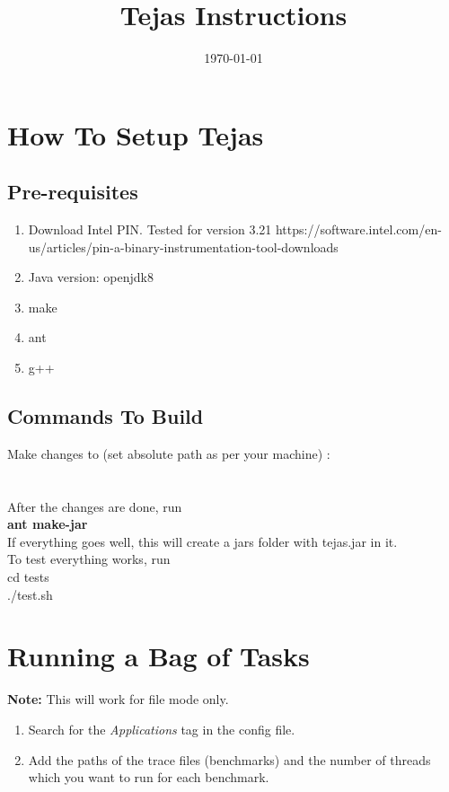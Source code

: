 \documentclass[12pt]{article}
\title{\textbf {Tejas Instructions}}
\date{\today}
\begin{document}
\maketitle
\section{How To Setup Tejas}
\subsection{Pre-requisites}
\begin{enumerate}
	\item Download Intel PIN. Tested for version 3.21
https://software.intel.com/en-us/articles/pin-a-binary-instrumentation-tool-downloads
	\item Java version: openjdk8
	\item make
	\item ant
	\item g++
\end{enumerate}

\subsection{Commands To Build}
Make changes to (set absolute path as per your machine) :\\
\\
\\
\noindent
After the changes are done, run \\
\textbf{ant make-jar}\\
If everything goes well, this will create a jars folder with tejas.jar in it.\\
To test everything works, run\\
 cd tests \\
 ./test.sh
 
 

\section{Running a Bag of Tasks}

\textbf{Note:} This will work for file mode only.

\begin{enumerate}
  \item Search for the \textit{Applications} tag in the config file.
  \item Add the paths of the trace files (benchmarks) and the number of threads which you want to run for each benchmark.
\end{enumerate}
\end{document}
